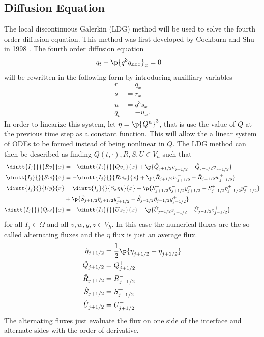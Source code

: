\documentclass[11pt, oneside]{article}
\begin{document}
\subsection{Diffusion Equation}
  The local discontinuous Galerkin (LDG) method will be used to solve the fourth order
  diffusion equation.
  This method was first developed by Cockburn and Shu in 1998 \cite{cockburn1998local}.
  The fourth order diffusion equation
  \begin{align*}
    q_t + \p{q^3 q_{xxx}}_x &= 0
  \end{align*}
  will be rewritten in the following form by introducing auxilliary variables
  \begin{align*}
    r &= q_{x} \\
    s &= r_{x} \\
    u &= q^3 s_{x} \\
    q_t &= -u_{x}.
  \end{align*}
  In order to linearize this system, let $\eta = \p{Q^n}^3$, that is use the
  value of $Q$ at the previous time step as a constant function.
  This will allow the a linear system of ODEs to be formed instead of being
  nonlinear in $Q$.
  The LDG method can then be described as finding $Q(t, \cdot), R, S, U \in V_h$
  such that
  \begin{align*}
    \dintt{I_j}{}{R v}{x} &= -\dintt{I_j}{}{Q v_x}{x} + \p{\hat{Q}_{j+1/2}v^-_{j+1/2} - \hat{Q}_{j-1/2} v^+_{j-1/2}} \\
    \dintt{I_j}{}{S w}{x} &= -\dintt{I_j}{}{R w_x}{x} + \p{\hat{R}_{j+1/2}w^-_{j+1/2} - \hat{R}_{j-1/2} w^+_{j-1/2}} \\
    \dintt{I_j}{}{U y}{x} &= \dintt{I_j}{}{S_x \eta y}{x} - \p{S^-_{j+1/2}\eta^-_{j+1/2}y^-_{j+1/2} - S^+_{j-1/2}\eta^+_{j-1/2}y^+_{j-1/2}} \\
    &+ \p{\hat{S}_{j+1/2} \hat{\eta}_{j+1/2} y^-_{j+1/2} - \hat{S}_{j-1/2} \hat{\eta}_{j-1/2} y^+_{j-1/2}} \\
    \dintt{I_j}{}{Q_t z}{x} &= -\dintt{I_j}{}{U z_x}{x} + \p{\hat{U}_{j+1/2}z^-_{j+1/2} - \hat{U}_{j-1/2} z^+_{j-1/2}}
  \end{align*}
  for all $I_j \in \Omega$ and all $v, w, y, z \in V_h$.
  In this case the numerical fluxes are the so called alternating fluxes and the
  $\eta$ flux is just an average flux.
  \begin{align*}
    \hat{\eta}_{j+1/2} &= \frac{1}{2}\p{\eta^+_{j+1/2} + \eta^-_{j+1/2}} \\
    \hat{Q}_{j+1/2} &= Q^+_{j+1/2} \\
    \hat{R}_{j+1/2} &= R^-_{j+1/2} \\
    \hat{S}_{j+1/2} &= S^+_{j+1/2} \\
    \hat{U}_{j+1/2} &= U^-_{j+1/2}
  \end{align*}
  The alternating fluxes just evaluate the flux on one side of the interface
  and alternate sides with the order of derivative.
\end{document}
